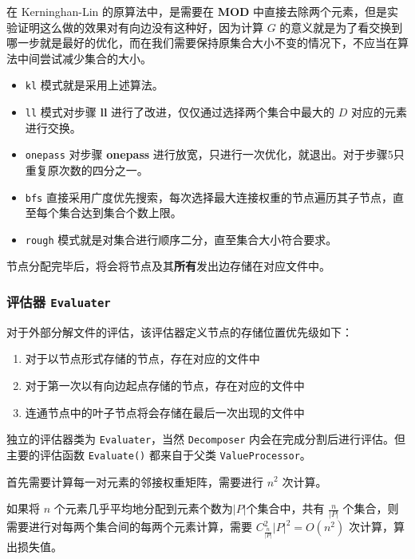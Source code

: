 \documentclass[a4paper,12pt]{article}
\begin{document}
\begin{CJK}{UTF8}{song}
在 Kerninghan-Lin 的原算法中，是需要在 \textbf{MOD} 中直接去除两个元素，但是实验证明这么做的效果对有向边没有这种好，因为计算 $G$ 的意义就是为了看交换到哪一步就是最好的优化，而在我们需要保持原集合大小不变的情况下，不应当在算法中间尝试减少集合的大小。

\begin{itemize}
\item
  \texttt{kl} 模式就是采用上述算法。
\item
  \texttt{ll}
  模式对步骤 \textbf{ll} 进行了改进，仅仅通过选择两个集合中最大的 $D$ 对应的元素进行交换。
\item
  \texttt{onepass}
  对步骤 \textbf{onepass} 进行放宽，只进行一次优化，就退出。对于步骤5只重复原次数的四分之一。
\item
  \texttt{bfs}
  直接采用广度优先搜索，每次选择最大连接权重的节点遍历其子节点，直至每个集合达到集合个数上限。
\item
  \texttt{rough} 模式就是对集合进行顺序二分，直至集合大小符合要求。
\end{itemize}

节点分配完毕后，将会将节点及其\textbf{所有}发出边存储在对应文件中。

\hypertarget{header-n185}{%
\subsubsection{\texorpdfstring{评估器
\texttt{Evaluater}}{评估器 Evaluater}}\label{header-n185}}

对于外部分解文件的评估，该评估器定义节点的存储位置优先级如下：

\begin{enumerate}
\def\labelenumi{\arabic{enumi}.}
\item
  对于以节点形式存储的节点，存在对应的文件中
\item
  对于第一次以有向边起点存储的节点，存在对应的文件中
\item
  连通节点中的叶子节点将会存储在最后一次出现的文件中
\end{enumerate}

独立的评估器类为 \texttt{Evaluater}，当然 \texttt{Decomposer}
内会在完成分割后进行评估。但主要的评估函数 \texttt{Evaluate()}
都来自于父类 \texttt{ValueProcessor}。

首先需要计算每一对元素的邻接权重矩阵，需要进行 $n^2$ 次计算。

如果将 $n$ 个元素几乎平均地分配到元素个数为$|P|$个集合中，共有 $\frac{n}{|P|}$ 个集合，则需要进行对每两个集合间的每两个元素计算，需要 $C_{\frac{n}{|P|}}^2|P|^2=O(n^2)$ 次计算，算出损失值。


\end{CJK}
\end{document}
